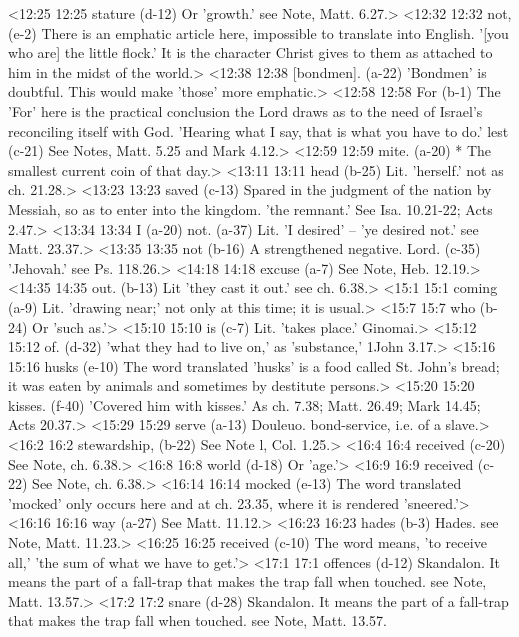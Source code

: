 <12:25 12:25  stature (d-12)  Or 'growth.' see Note, Matt. 6.27.>
<12:32 12:32  not, (e-2)  There is an emphatic article here, impossible to translate  into English. '[you who are] the little flock.' It is the  character Christ gives to them as attached to him in the midst  of the world.>
<12:38 12:38  [bondmen]. (a-22)  'Bondmen' is doubtful. This would make 'those' more emphatic.>
<12:58 12:58  For (b-1)  The 'For' here is the practical conclusion the Lord draws as  to the need of Israel's reconciling itself with God. 'Hearing  what I say, that is what you have to do.'
  lest (c-21)  See Notes, Matt. 5.25 and Mark 4.12.>
<12:59 12:59  mite. (a-20)  * The smallest current coin of that day.>
<13:11 13:11  head (b-25)  Lit. 'herself.' not as ch. 21.28.>
<13:23 13:23  saved (c-13)  Spared in the judgment of the nation by Messiah, so as to  enter into the kingdom. 'the remnant.' See Isa. 10.21-22; Acts 2.47.>
<13:34 13:34  I (a-20)  not. (a-37)
  Lit. 'I desired' -- 'ye desired not.' see Matt. 23.37.>
<13:35 13:35  not (b-16)  A strengthened negative.
  Lord. (c-35)  'Jehovah.' see Ps. 118.26.>
<14:18 14:18  excuse (a-7)  See Note, Heb. 12.19.>
<14:35 14:35  out. (b-13)  Lit 'they cast it out.' see ch. 6.38.>
<15:1 15:1  coming (a-9)  Lit. 'drawing near;' not only at this time; it is usual.>
<15:7 15:7  who (b-24)  Or 'such as.'>
<15:10 15:10  is (c-7)  Lit. 'takes place.' Ginomai.>
<15:12 15:12  of. (d-32)  'what they had to live on,' as 'substance,' 1John 3.17.>
<15:16 15:16  husks (e-10)  The word translated 'husks' is a food called St. John's  bread; it was eaten by animals and sometimes by destitute  persons.>
<15:20 15:20  kisses. (f-40)  'Covered him with kisses.' As ch. 7.38; Matt. 26.49; Mark  14.45; Acts 20.37.>
<15:29 15:29  serve (a-13)  Douleuo. bond-service, i.e. of a slave.>
<16:2 16:2  stewardship, (b-22)  See Note l, Col. 1.25.>
<16:4 16:4  received (c-20) See Note, ch. 6.38.>
<16:8 16:8  world (d-18)  Or 'age.'>
<16:9 16:9  received (c-22)  See Note, ch. 6.38.>
<16:14 16:14  mocked (e-13)  The word translated 'mocked' only occurs here and at ch.  23.35, where it is rendered 'sneered.'>
<16:16 16:16  way (a-27)  See Matt. 11.12.>
<16:23 16:23  hades (b-3)  Hades. see Note, Matt. 11.23.>
<16:25 16:25  received (c-10)  The word means, 'to receive all,' 'the sum of what we have to  get.'>
<17:1 17:1  offences (d-12)  Skandalon. It means the part of a fall-trap that makes the  trap fall when touched. see Note, Matt. 13.57.>
<17:2 17:2  snare (d-28)  Skandalon. It means the part of a fall-trap that makes the  trap fall when touched. see Note, Matt. 13.57.
